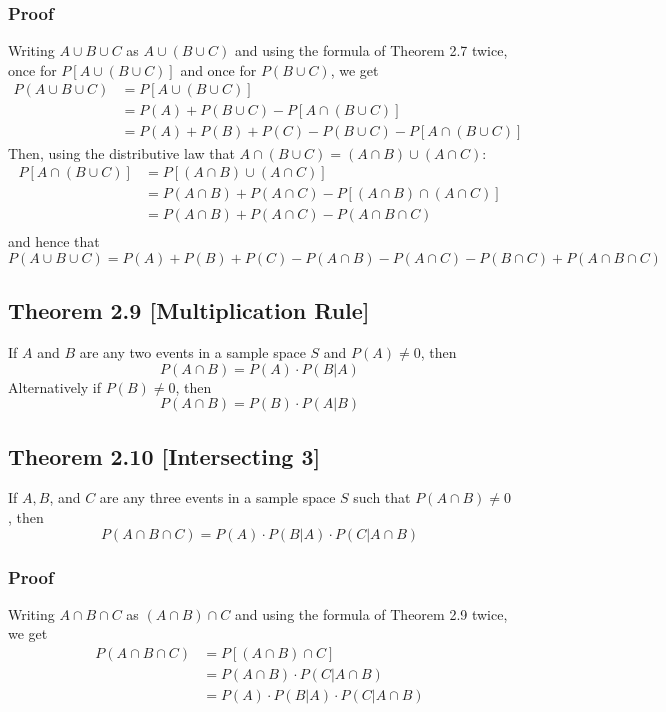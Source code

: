\documentclass{article}
\begin{document}
\subsubsection*{Proof}
Writing \(A \cup B \cup C \) as \(A \cup (B \cup C) \) and using the formula of Theorem 2.7 twice, once for \(P[A \cup (B \cup C)]\) and once for \(P(B \cup C) \), we get
\begin{align*}
P(A \cup B \cup C) &= P[ A \cup (B \cup C)]\\
&= P(A) + P(B \cup C) - P[A \cap (B \cup C)]\\
&= P(A) + P(B) + P(C) - P(B \cup C) - P[A \cap (B \cup C)]
\end{align*}
Then, using the distributive law that \(A \cap (B \cup C) = (A \cap B) \cup (A \cap C)\):
\begin{align*}
P[A \cap (B \cup C)] &= P[(A \cap B) \cup (A \cap C)] \\
&= P(A \cap B) + P(A \cap C) - P[(A \cap B) \cap (A \cap C)]\\
&= P(A \cap B) + P(A \cap C) - P(A \cap B \cap C)\\
\end{align*}
and hence that
\[
P(A \cup B \cup C)= P(A) + P(B) + P(C) - P(A \cap B) - P(A \cap C) - P(B \cap C) + P(A \cap B \cap C)
\]

\subsection*{Theorem 2.9 [Multiplication Rule]}
If \(A\) and \(B\) are any two events in a sample space \(S\) and \(P(A)\ne 0\), then
\[
P(A \cap B)=P(A) \cdot P(B|A)
\]
Alternatively if \(P(B)\ne 0\), then
\[
P(A \cap B)=P(B) \cdot P(A|B)
\]

\subsection*{Theorem 2.10 [Intersecting 3]}
If \(A, B\), and \(C\) are any three events in a sample space \(S\) such that \(P(A \cap B) \ne 0\), then
\[
P(A \cap B \cap C) = P(A) \cdot P(B|A) \cdot P(C|A \cap B)
\]

\subsubsection*{Proof}
Writing \(A \cap B \cap C\) as \((A \cap B) \cap C\) and using the formula of Theorem 2.9 twice, we get
\begin{align*}
P(A \cap B \cap C) &= P[(A \cap B) \cap C]\\
&= P(A \cap B) \cdot P(C|A \cap B)\\
&= P(A) \cdot P(B|A) \cdot P(C|A \cap B)
\end{align*}
\end{document}
